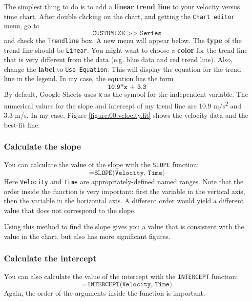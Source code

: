 The simplest thing to do is to add a \textbf{linear trend line} to your velocity versus time chart. After double clicking on the chart, and getting the \texttt{Chart editor} menu, go to
\begin{equation}
    \texttt{CUSTOMIZE >> Series}
\end{equation}
and check the \texttt{Trendline} box. A new menu will appear below. The \textbf{type} of the trend line should be \texttt{Linear}. You might want to choose a \textbf{color} for the trend line that is very different from the data (e.g. blue data and red trend line). Also, change the \textbf{label} to \texttt{Use Equation}. This will display the equation for the trend line in the legend. In my case, the equation has the form
\begin{equation}
    \texttt{10.9*x + 3.3}
\end{equation}
By default, Google Sheets uses \texttt{x} as the symbol for the independent variable. The numerical values for the slope and intercept of my trend line are 10.9 m/s\textsuperscript{2} and 3.3 m/s. In my case, Figure \ref{figure:00.velocity.fit} shows the velocity data and the best-fit line.
%
\subsubsection{Calculate the slope}
%
You can calculate the value of the slope with the \texttt{SLOPE} function:
\begin{equation}
    \texttt{=SLOPE(Velocity, Time)}
\end{equation}
Here \texttt{Velocity} and \texttt{Time} are appropriately-defined named ranges. Note that the order inside the function is very important: first the variable in the vertical axis, then the variable in the horizontal axis. A different order would yield a different value that does not correspond to the slope.

Using this method to find the slope gives you a value that is consistent with the value in the chart, but also has more significant figures.
%
\subsubsection{Calculate the intercept}
%
You can also calculate the value of the intercept with the \texttt{INTERCEPT} function:
\begin{equation}
    \texttt{=INTERCEPT(Velocity, Time)}
\end{equation}
Again, the order of the arguments inside the function is important.
%

